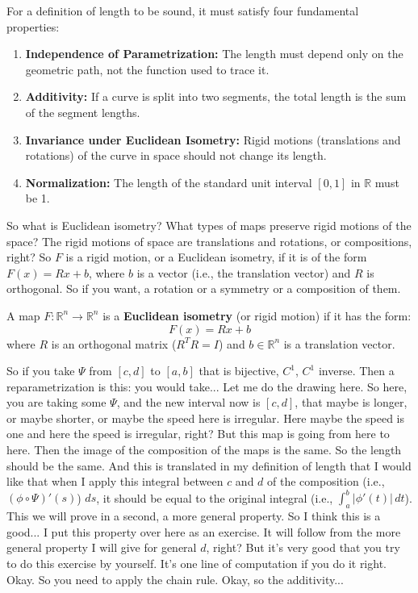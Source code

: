 \begin{math-stroke}
For a definition of length to be sound, it must satisfy four fundamental properties:
\begin{enumerate}
    \item \textbf{Independence of Parametrization:} The length must depend only on the geometric path, not the function used to trace it.
    \item \textbf{Additivity:} If a curve is split into two segments, the total length is the sum of the segment lengths.
    \item \textbf{Invariance under Euclidean Isometry:} Rigid motions (translations and rotations) of the curve in space should not change its length.
    \item \textbf{Normalization:} The length of the standard unit interval $[0,1]$ in $\mathbb{R}$ must be 1.
\end{enumerate}
\end{math-stroke}

\begin{spoken-clean}[13:55 - 15:07]
So what is Euclidean isometry? What types of maps preserve rigid motions of the space? The rigid motions of space are translations and rotations, or compositions, right? So $F$ is a rigid motion, or a Euclidean isometry, if it is of the form $F(x) = Rx+b$, where $b$ is a vector (i.e., the translation vector) and $R$ is orthogonal. So if you want, a rotation or a symmetry or a composition of them.
\end{spoken-clean}

\begin{math-stroke}
A map $F: \mathbb{R}^n \to \mathbb{R}^n$ is a \textbf{Euclidean isometry} (or rigid motion) if it has the form:
\[
F(x) = Rx+b
\]
where $R$ is an orthogonal matrix ($R^T R = I$) and $b \in \mathbb{R}^n$ is a translation vector.
\end{math-stroke}

\begin{spoken-clean}[15:07 - 17:52]
So if you take $\Psi$ from $[c,d]$ to $[a,b]$ that is bijective, $C^1$, $C^1$ inverse. Then a reparametrization is this: you would take... Let me do the drawing here. So here, you are taking some $\Psi$, and the new interval now is $[c,d]$, that maybe is longer, or maybe shorter, or maybe the speed here is irregular. Here maybe the speed is one and here the speed is irregular, right? But this map is going from here to here. Then the image of the composition of the maps is the same. So the length should be the same. And this is translated in my definition of length that I would like that when I apply this integral between $c$ and $d$ of the composition (i.e., $(\phi \circ \Psi)'(s)$) $ds$, it should be equal to the original integral (i.e., $\int_a^b |\phi'(t)| \, dt$).
This we will prove in a second, a more general property. So I think this is a good... I put this property over here as an exercise. It will follow from the more general property I will give for general $d$, right? But it's very good that you try to do this exercise by yourself. It's one line of computation if you do it right. Okay. So you need to apply the chain rule. Okay, so the additivity...
\end{spoken-clean}

